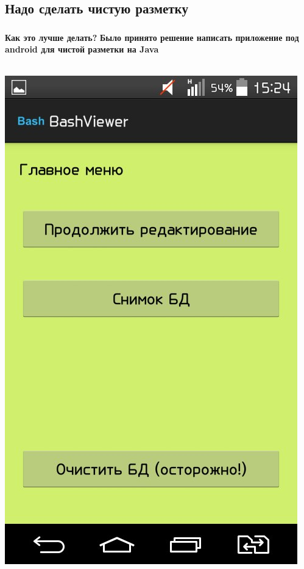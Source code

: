 \documentclass[t]{beamer}
\begin{document}
	\subsection{Надо сделать чистую разметку}
	\begin{frame}
		\frametitle{\insertsection}
		\framesubtitle{\insertsubsection}
		\textbf{Как это лучше делать?}\pause
		\textbf{ Было принято решение написать приложение под android для чистой разметки на Java}\pause
		
		~~~~~~~
		{\includegraphics[scale = 0.17]{images/Bash1.jpg}
}
\end{frame}
\end{document}
